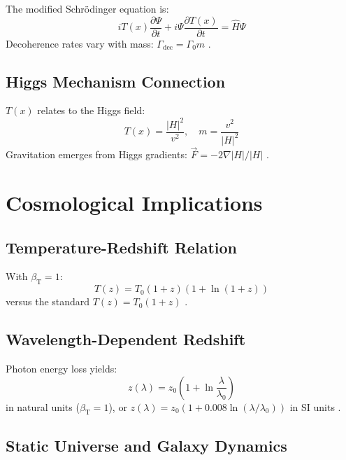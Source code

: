 \documentclass[12pt,a4paper]{article}
\newcommand{\Tfield}{T(x)}
\newcommand{\betaT}{\beta_{\text{T}}}
\begin{document}
	The modified Schrödinger equation is:
	\begin{equation}
		i \Tfield \frac{\partial \Psi}{\partial t} + i \Psi \frac{\partial \Tfield}{\partial t} = \hat{H} \Psi
	\end{equation}
	Decoherence rates vary with mass: \(\Gamma_{\text{dec}} = \Gamma_0 m\) \cite{pascher_erweiterung_2025}.
	
	\subsection{Higgs Mechanism Connection}
	
	\(\Tfield\) relates to the Higgs field:
	\begin{equation}
		\Tfield = \frac{|H|^2}{v^2}, \quad m = \frac{v^2}{|H|^2}
	\end{equation}
	Gravitation emerges from Higgs gradients: \(\vec{F} = -2 \nabla |H| / |H|\) \cite{pascher_higgs_2025}.
	
	\section{Cosmological Implications}
	
	\subsection{Temperature-Redshift Relation}
	
	With \(\betaT = 1\):
	\begin{equation}
		T(z) = T_0 (1 + z) (1 + \ln(1 + z))
	\end{equation}
	versus the standard \(T(z) = T_0 (1 + z)\) \cite{pascher_temp_2025}.
	
	\subsection{Wavelength-Dependent Redshift}
	
	Photon energy loss yields:
	\begin{equation}
		z(\lambda) = z_0 \left(1 + \ln \frac{\lambda}{\lambda_0}\right)
	\end{equation}
	in natural units (\(\betaT = 1\)), or \(z(\lambda) = z_0 (1 + 0.008 \ln (\lambda/\lambda_0))\) in SI units \cite{pascher_photons_2025}.
	
	\subsection{Static Universe and Galaxy Dynamics}
	
\end{document}
